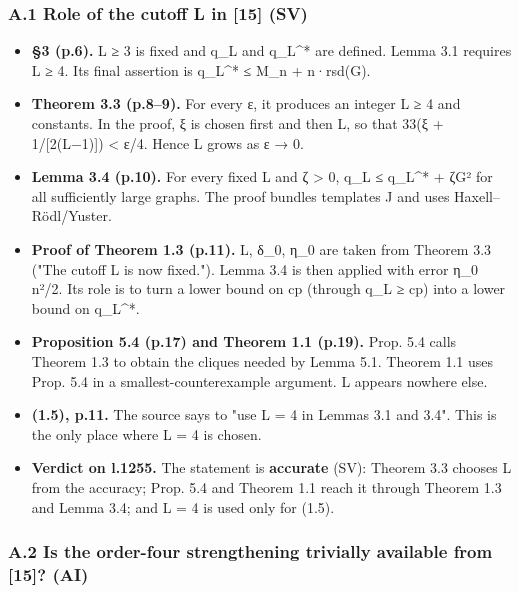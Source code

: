 \documentclass[
]{article}
\providecommand{\tightlist}{%
  \setlength{\itemsep}{0pt}\setlength{\parskip}{0pt}}
\begin{document}
\subsubsection{A.1 Role of the cutoff L in {[}15{]}
(SV)}\label{a1-role-of-the-cutoff-l-in-15-sv}

\begin{itemize}
\tightlist
\item
  \textbf{§3 (p.6).} L ≥ 3 is fixed and q\_L and q\_L\^{}* are defined.
  Lemma 3.1 requires L ≥ 4. Its final assertion is q\_L\^{}* ≤ M\_n +
  n·rsd(G).
\item
  \textbf{Theorem 3.3 (p.8--9).} For every ε, it produces an integer L ≥
  4 and constants. In the proof, ξ is chosen first and then L, so that
  33(ξ + 1/{[}2(L−1){]}) \textless{} ε/4. Hence L grows as ε → 0.
\item
  \textbf{Lemma 3.4 (p.10).} For every fixed L and ζ \textgreater{} 0,
  q\_L ≤ q\_L\^{}* + ζ\textbar G\textbar² for all sufficiently large
  graphs. The proof bundles templates J and uses Haxell--Rödl/Yuster.
\item
  \textbf{Proof of Theorem 1.3 (p.11).} L, δ\_0, η\_0 are taken from
  Theorem 3.3 ("The cutoff L is now fixed."). Lemma 3.4 is then applied
  with error η\_0 n²/2. Its role is to turn a lower bound on cp (through
  q\_L ≥ cp) into a lower bound on q\_L\^{}*.
\item
  \textbf{Proposition 5.4 (p.17) and Theorem 1.1 (p.19).} Prop. 5.4
  calls Theorem 1.3 to obtain the cliques needed by Lemma 5.1. Theorem
  1.1 uses Prop. 5.4 in a smallest-counterexample argument. L appears
  nowhere else.
\item
  \textbf{(1.5), p.11.} The source says to "use L = 4 in Lemmas 3.1 and
  3.4". This is the only place where L = 4 is chosen.
\item
  \textbf{Verdict on l.1255.} The statement is \textbf{accurate} (SV):
  Theorem 3.3 chooses L from the accuracy; Prop. 5.4 and Theorem 1.1
  reach it through Theorem 1.3 and Lemma 3.4; and L = 4 is used only for
  (1.5).
\end{itemize}

\subsubsection{A.2 Is the order-four strengthening trivially available
from {[}15{]}?
(AI)}\label{a2-is-the-order-four-strengthening-trivially-available-from-15-ai}
\end{document}
